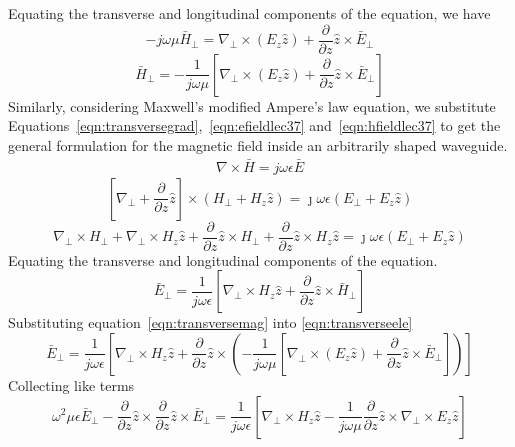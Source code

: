 Equating the transverse and longitudinal components of the equation, we have
\begin{dmath*}
-j\omega\mu\bar{H}_\bot = \nabla_\bot\times(E_z\hat{z}) + \frac{\partial}{\partial z}\hat{z}\times\bar{E}_\bot
\end{dmath*}
\begin{dmath}
\bar{H}_\bot = -\frac{1}{j\omega\mu} \left[\nabla_\bot\times(E_z\hat{z}) + \frac{\partial}{\partial z}\hat{z}\times\bar{E}_\bot\right]
\label{eqn:transversemag}
\end{dmath}
Similarly, considering Maxwell's modified Ampere's law equation, we substitute Equations~\ref{eqn:transversegrad},~\ref{eqn:efieldlec37} and~\ref{eqn:hfieldlec37} to get the general formulation for the magnetic field inside an arbitrarily shaped waveguide.
\begin{align*}
\nabla\times\bar{H} = j\omega\epsilon\bar{E}
\end{align*}
\begin{dmath*}
\left[ \nabla_\bot + \frac{\partial}{\partial z}\hat{z} \right] \times (H_\bot + H_z \hat{z}) = \jmath \omega\epsilon (E_\bot + E_z \hat{z})
\end{dmath*}
\begin{dmath*}
\nabla_\bot\times H_\bot + \nabla_\bot\times H_z \hat{z} +  \frac{\partial}{\partial z}\hat{z}\times H_\bot + \frac{\partial}{\partial z}\hat{z}\times H_z \hat{z} = \jmath \omega\epsilon (E_\bot + E_z \hat{z})
\end{dmath*}
Equating the transverse and longitudinal components of the equation.
\begin{dmath}
\bar{E}_\bot = \frac{1}{j\omega\epsilon} \left[\nabla_\bot\times H_z\hat{z} + \frac{\partial}{\partial z}\hat{z}\times\bar{H}_\bot\right]
\label{eqn:transverseele}
\end{dmath}
Substituting equation~\ref{eqn:transversemag} into \ref{eqn:transverseele}
\begin{dmath*}
\bar{E}_\bot = \frac{1}{j\omega\epsilon} \left[\nabla_\bot\times H_z\hat{z} + \frac{\partial}{\partial z}\hat{z}\times \left( -\frac{1}{j\omega\mu} \left[\nabla_\bot\times(E_z\hat{z}) + \frac{\partial}{\partial z}\hat{z}\times\bar{E}_\bot\right] \right)\right] 
\end{dmath*}
Collecting like terms
\begin{dmath}
\omega^2\mu\epsilon\bar{E}_\bot-\frac{\partial}{\partial z}\hat{z}\times\frac{\partial}{\partial z}\hat{z}\times\bar{E}_\bot = \frac{1}{j\omega\epsilon} \left[\nabla_\bot\times H_z\hat{z} - \frac{1}{j\omega\mu}\frac{\partial}{\partial z}\hat{z}\times\nabla_\bot\times E_z \hat{z} \right]
\label{eqn:electricfieldinwg}
\end{dmath}
